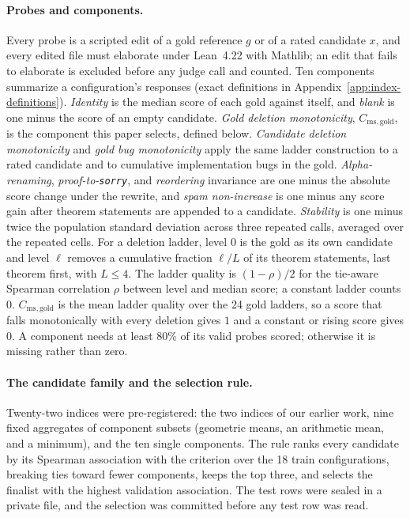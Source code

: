 \paragraph{Probes and components.}
Every probe is a scripted edit of a gold reference $g$ or of a rated candidate $x$, and every edited file must elaborate under Lean~4.22 with Mathlib; an edit that fails to elaborate is excluded before any judge call and counted.
Ten components summarize a configuration's responses (exact definitions in Appendix~\ref{app:index-definitions}).
\emph{Identity} is the median score of each gold against itself, and \emph{blank} is one minus the score of an empty candidate.
\emph{Gold deletion monotonicity}, $C_{\mathrm{ms,gold}}$, is the component this paper selects, defined below.
\emph{Candidate deletion monotonicity} and \emph{gold bug monotonicity} apply the same ladder construction to a rated candidate and to cumulative implementation bugs in the gold.
\emph{Alpha-renaming}, \emph{proof-to-\texttt{sorry}}, and \emph{reordering} invariance are one minus the absolute score change under the rewrite, and \emph{spam non-increase} is one minus any score gain after theorem statements are appended to a candidate.
\emph{Stability} is one minus twice the population standard deviation across three repeated calls, averaged over the repeated cells.
For a deletion ladder, level $0$ is the gold as its own candidate and level $\ell$ removes a cumulative fraction $\ell/L$ of its theorem statements, last theorem first, with $L\le 4$.
The ladder quality is $(1-\rho)/2$ for the tie-aware Spearman correlation $\rho$ between level and median score; a constant ladder counts $0$.
$C_{\mathrm{ms,gold}}$ is the mean ladder quality over the 24 gold ladders, so a score that falls monotonically with every deletion gives $1$ and a constant or rising score gives $0$.
A component needs at least 80\% of its valid probes scored; otherwise it is missing rather than zero.

\paragraph{The candidate family and the selection rule.}
Twenty-two indices were pre-registered: the two indices of our earlier work, nine fixed aggregates of component subsets (geometric means, an arithmetic mean, and a minimum), and the ten single components.
The rule ranks every candidate by its Spearman association with the criterion over the 18 train configurations, breaking ties toward fewer components, keeps the top three, and selects the finalist with the highest validation association.
The test rows were sealed in a private file, and the selection was committed before any test row was read.

